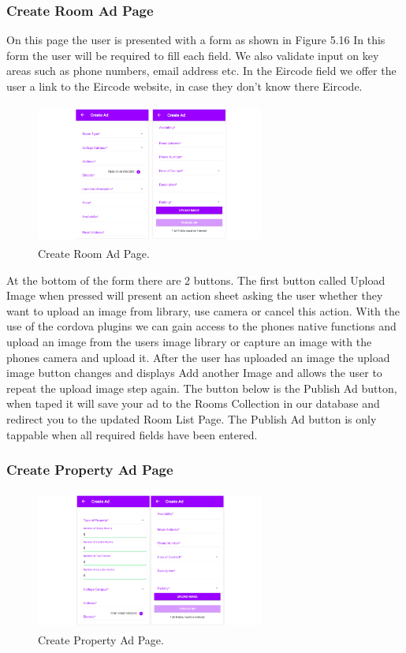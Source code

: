 \subsubsection{Create Room Ad Page}

On this page the user is presented with a form as shown in Figure 5.16 In this form the user will be required to fill each field. We also validate input on key areas such as phone numbers, email address etc. In the Eircode field we offer the user a link to the Eircode website, in case they don’t know there Eircode. 

\begin{figure}[h]
\centering
\includegraphics[width=7.5cm, height=4.6cm]{img/createRoom}
\caption{Create Room Ad Page.}
\end{figure}

\noindent At the bottom of the form there are 2 buttons. The first button called Upload Image when pressed will present an action sheet asking the user whether they want to upload an image from library, use camera or cancel this action. With the use of the cordova plugins we can gain access to the phones native functions and upload an image from the users image library or capture an image with the phones camera and upload it. After the user has uploaded an image the upload image button changes and displays Add another Image and allows the user to repeat the upload image step again. The button below is the Publish Ad button, when taped it will save your ad to the Rooms Collection in our database and redirect you to the updated Room List Page. The Publish Ad button is only tappable when all required fields have been entered.

\subsubsection{Create Property Ad Page}

\begin{figure}[h]
\centering
\includegraphics[width=7.5cm, height=4.6cm]{img/createProperty}
\caption{Create Property Ad Page.}
\end{figure}


